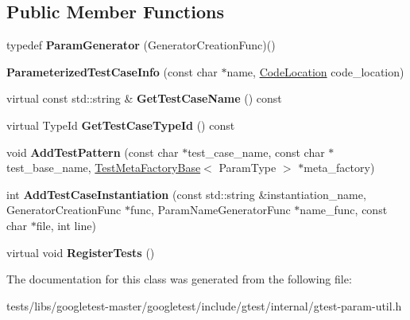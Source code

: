 \subsection*{Public Member Functions}
\begin{DoxyCompactItemize}
\item 
\mbox{\label{classtesting_1_1internal_1_1ParameterizedTestCaseInfo_a2f6a423f7ae8c7ac24b468538693aa26}} 
typedef {\bfseries Param\+Generator} (Generator\+Creation\+Func)()
\item 
\mbox{\label{classtesting_1_1internal_1_1ParameterizedTestCaseInfo_a6d19f368428260bd5c6e608b4d3fc6af}} 
{\bfseries Parameterized\+Test\+Case\+Info} (const char $\ast$name, \hyperlink{structtesting_1_1internal_1_1CodeLocation}{Code\+Location} code\+\_\+location)
\item 
\mbox{\label{classtesting_1_1internal_1_1ParameterizedTestCaseInfo_a8a9eafc7654b154165f131974397e200}} 
virtual const std\+::string \& {\bfseries Get\+Test\+Case\+Name} () const
\item 
\mbox{\label{classtesting_1_1internal_1_1ParameterizedTestCaseInfo_a16ed77e95a6042c722d0029744acfc33}} 
virtual Type\+Id {\bfseries Get\+Test\+Case\+Type\+Id} () const
\item 
\mbox{\label{classtesting_1_1internal_1_1ParameterizedTestCaseInfo_a3e557c888ec5e23b138c2ff254db15e5}} 
void {\bfseries Add\+Test\+Pattern} (const char $\ast$test\+\_\+case\+\_\+name, const char $\ast$test\+\_\+base\+\_\+name, \hyperlink{classtesting_1_1internal_1_1TestMetaFactoryBase}{Test\+Meta\+Factory\+Base}$<$ Param\+Type $>$ $\ast$meta\+\_\+factory)
\item 
\mbox{\label{classtesting_1_1internal_1_1ParameterizedTestCaseInfo_adefded091e3f20ac3a758029caea3eab}} 
int {\bfseries Add\+Test\+Case\+Instantiation} (const std\+::string \&instantiation\+\_\+name, Generator\+Creation\+Func $\ast$func, Param\+Name\+Generator\+Func $\ast$name\+\_\+func, const char $\ast$file, int line)
\item 
\mbox{\label{classtesting_1_1internal_1_1ParameterizedTestCaseInfo_a7e118820b3074ce70c0440e2e49a50a1}} 
virtual void {\bfseries Register\+Tests} ()
\end{DoxyCompactItemize}


The documentation for this class was generated from the following file\+:\begin{DoxyCompactItemize}
\item 
tests/libs/googletest-\/master/googletest/include/gtest/internal/gtest-\/param-\/util.\+h\end{DoxyCompactItemize}
